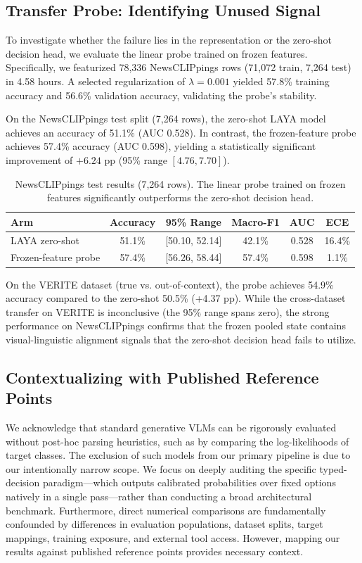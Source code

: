 \documentclass{article} %
\begin{document}
\subsection{Transfer Probe: Identifying Unused Signal}
To investigate whether the failure lies in the representation or the zero-shot decision head, we evaluate the linear probe trained on frozen features. Specifically, we featurized 78,336 NewsCLIPpings rows (71,072 train, 7,264 test) in 4.58 hours. A selected regularization of $\lambda=0.001$ yielded 57.8\% training accuracy and 56.6\% validation accuracy, validating the probe's stability.

On the NewsCLIPpings test split (7,264 rows), the zero-shot LAYA model achieves an accuracy of 51.1\% (AUC 0.528). In contrast, the frozen-feature probe achieves 57.4\% accuracy (AUC 0.598), yielding a statistically significant improvement of $+6.24$ pp (95\% range $[4.76, 7.70]$). 

\begin{table}[h]
\caption{NewsCLIPpings test results (7,264 rows). The linear probe trained on frozen features significantly outperforms the zero-shot decision head.}
\label{tab:newsclippings_probe}
\begin{center}
\begin{tabular}{lccccc}
\toprule
\textbf{Arm} & \textbf{Accuracy} & \textbf{95\% Range} & \textbf{Macro-F1} & \textbf{AUC} & \textbf{ECE} \\
\midrule
LAYA zero-shot & 51.1\% & [50.10, 52.14] & 42.1\% & 0.528 & 16.4\% \\
Frozen-feature probe & 57.4\% & [56.26, 58.44] & 57.4\% & 0.598 & 1.1\% \\
\bottomrule
\end{tabular}
\end{center}
\end{table}

On the VERITE dataset (true vs. out-of-context), the probe achieves 54.9\% accuracy compared to the zero-shot 50.5\% (+4.37 pp). While the cross-dataset transfer on VERITE is inconclusive (the 95\% range spans zero), the strong performance on NewsCLIPpings confirms that the frozen pooled state contains visual-linguistic alignment signals that the zero-shot decision head fails to utilize.

\subsection{Contextualizing with Published Reference Points}
We acknowledge that standard generative VLMs can be rigorously evaluated without post-hoc parsing heuristics, such as by comparing the log-likelihoods of target classes. The exclusion of such models from our primary pipeline is due to our intentionally narrow scope. We focus on deeply auditing the specific typed-decision paradigm---which outputs calibrated probabilities over fixed options natively in a single pass---rather than conducting a broad architectural benchmark. Furthermore, direct numerical comparisons are fundamentally confounded by differences in evaluation populations, dataset splits, target mappings, training exposure, and external tool access. However, mapping our results against published reference points provides necessary context. 
\end{document}
